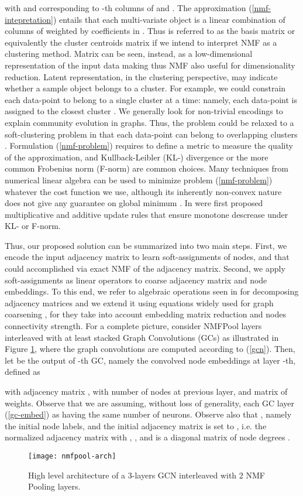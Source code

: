 \documentclass[runningheads]{llncs}
\begin{document}
with  and  corresponding to -th columns of  and .  The approximation (\ref{nmf-intepretation}) entails that each multi-variate object is a linear combination of columns of  weighted by coefficients in . Thus  is referred to as the basis matrix or equivalently the cluster centroids matrix if we intend to interpret NMF as a clustering method. Matrix  can be seen, instead, as a low-dimensional representation of the input data making thus NMF also useful for dimensionality reduction. Latent representation, in the clustering perspective, may indicate whether a sample object belongs to a cluster. For example, we could constrain each data-point to belong to a single cluster at a time: namely, each data-point is assigned to the closest cluster . We generally look for non-trivial encodings to explain community evolution in graphs. Thus, the problem could be relaxed to a soft-clustering problem in that each data-point can belong to  overlapping clusters \cite{Watt:2016:MLR:3126125}.  Formulation (\ref{nmf-problem}) requires to define a metric to measure the quality of the approximation, and  Kullback-Leibler (KL-) divergence or the more common Frobenius norm (F-norm) are common choices.
Many techniques from numerical linear algebra can be used to minimize problem (\ref{nmf-problem}) whatever the cost function we use, although its inherently non-convex nature does not give any guarantee on global minimum \cite{2019arXiv190301321F}. In  \cite{NIPS2000_1861} were first proposed multiplicative and additive update rules that ensure monotone descrease under KL- or F-norm.

Thus, our proposed solution can be summarized into two main steps. First, we encode the input adjacency matrix to learn soft-assignments of nodes, and that could accomplished via exact NMF of the adjacency matrix. Second, we apply soft-assignments as linear operators to coarse adjacency matrix and node embeddings.  To this end, we refer to algebraic operations seen in \cite{NIPS2005_2948} for decomposing adjacency matrices and we extend it using equations widely used for graph coarsening \cite{NIPS2018_7729}, for they take into account embedding matrix reduction and nodes connectivity strength. For a complete picture, consider  NMFPool layers interleaved with at least  stacked Graph Convolutions (GCs) as illustrated in Figure \ref{figArch}, where the graph convolutions are computed according to (\ref{gcn}). Then, let  be the output of -th GC, namely the convolved node embeddings at layer -th, defined as

with adjacency matrix , with  number of nodes at previous layer, and  matrix of weights. Observe that we are assuming, without loss of generality, each GC layer (\ref{gc-embed}) as having the same number of neurons. Observe also that , namely the initial node labels, and the initial adjacency matrix is set to , i.e. the normalized adjacency matrix with , , and  is a diagonal matrix of node degrees \cite{DBLP:journals/corr/KipfW16}.
\begin{figure}
\centering
\texttt{[image: nmfpool-arch]}
\caption{High level architecture of a 3-layers GCN interleaved with 2 NMF Pooling layers.} \label{figArch}
\end{figure}
\end{document}
